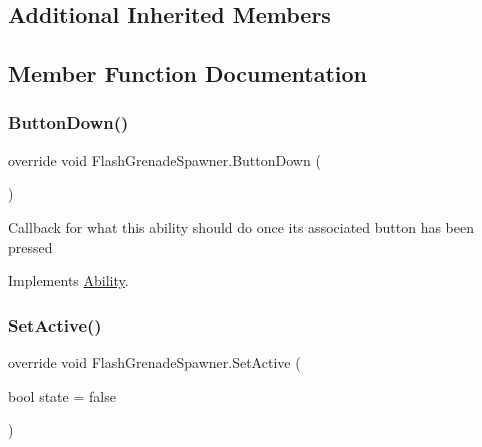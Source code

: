 \subsection*{Additional Inherited Members}


\subsection{Member Function Documentation}
\hypertarget{class_flash_grenade_spawner_a9f578f3c3fcb0ed1be466f37b5b401c5}{}\label{class_flash_grenade_spawner_a9f578f3c3fcb0ed1be466f37b5b401c5} 
\subsubsection{\texorpdfstring{Button\+Down()}{ButtonDown()}}
{\footnotesize\ttfamily override void Flash\+Grenade\+Spawner.\+Button\+Down (\begin{DoxyParamCaption}{ }\end{DoxyParamCaption})\hspace{0.3cm}{\ttfamily [virtual]}}



Callback for what this ability should do once its associated button has been pressed 



Implements \hyperlink{class_ability_a7722265862f8b29828315725415ce266}{Ability}.

\hypertarget{class_flash_grenade_spawner_a704b6a24aae16c35578a5469f1773bbc}{}\label{class_flash_grenade_spawner_a704b6a24aae16c35578a5469f1773bbc} 
\subsubsection{\texorpdfstring{Set\+Active()}{SetActive()}}
{\footnotesize\ttfamily override void Flash\+Grenade\+Spawner.\+Set\+Active (\begin{DoxyParamCaption}\item[{bool}]{state = {\ttfamily false} }\end{DoxyParamCaption})\hspace{0.3cm}{\ttfamily [virtual]}}



